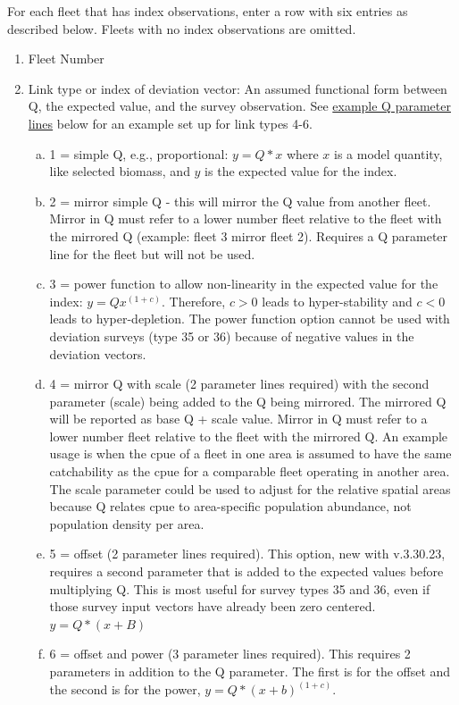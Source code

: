 For each fleet that has index observations, enter a row with six entries as described below. Fleets with no index observations are omitted.

\begin{enumerate}
	\item Fleet Number
	\item Link type or index of deviation vector: An assumed functional form between Q, the expected value, and the survey observation. See \hyperlink{QParams}{example Q parameter lines} below for an example set up for link types 4-6.
	\begin{enumerate}[(a)]
		\item 1 = simple Q, e.g., proportional: $y=Q*x$ where $x$ is a model quantity, like selected biomass, and $y$ is the expected value for the index.
		\item 2 = mirror simple Q - this will mirror the Q value from another fleet. Mirror in Q must refer to a lower number fleet relative to the fleet with the mirrored Q (example: fleet 3 mirror fleet 2). Requires a Q parameter line for the fleet but will not be used.
		\item 3 = power function to allow non-linearity in the expected value for the index: $y=Qx^{(1+c)}$. Therefore, $c > 0$ leads to hyper-stability and $c < 0$ leads to hyper-depletion. The power function option cannot be used with deviation surveys (type 35 or 36) because of negative values in the deviation vectors.
		\item 4 = mirror Q with scale (2 parameter lines required) with the second parameter (scale) being added to the Q being mirrored. The mirrored Q will be reported as base Q + scale value. Mirror in Q must refer to a lower number fleet relative to the fleet with the mirrored Q. An example usage is when the \gls{cpue} of a fleet in one area is assumed to have the same catchability as the \gls{cpue} for a comparable fleet operating in another area. The scale parameter could be used to adjust for the relative spatial areas because Q relates \gls{cpue} to area-specific population abundance, not population density per area.
		\item 5 = offset (2 parameter lines required). This option, new with v.3.30.23, requires a second parameter that is added to the expected values before multiplying Q. This is most useful for survey types 35 and 36, even if those survey input vectors have already been zero centered. $y=Q*(x+B)$
		\item 6 = offset and power (3 parameter lines required). This requires 2 parameters in addition to the Q parameter. The first is for the offset and the second is for the power, $y=Q*(x+b)^{(1+c)}$.

\end{enumerate}
\end{enumerate}
